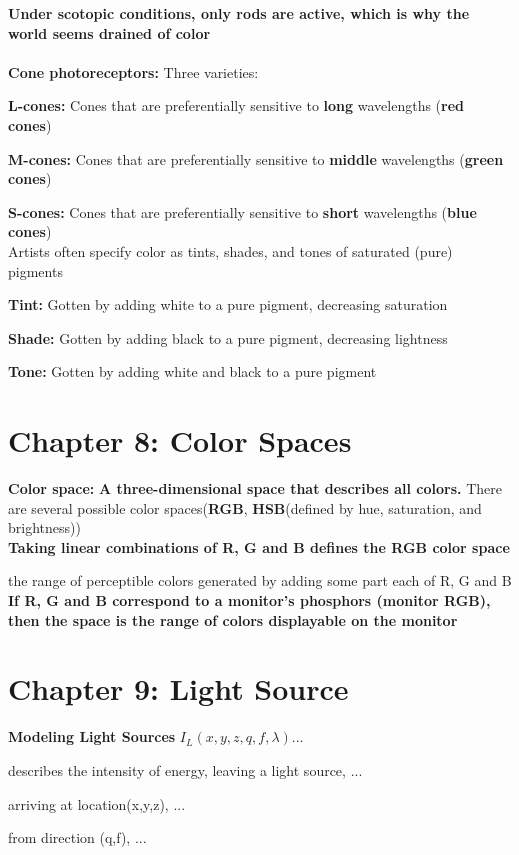 \documentclass[]{report}
\begin{document}
\textbf{Under scotopic conditions, only rods are active, which is why the world seems drained of color}\\
\\
\textbf{Cone photoreceptors:} Three varieties:

\textbf{L-cones:} Cones that are preferentially sensitive to \textbf{long} wavelengths
(\textbf{red cones})

\textbf{M-cones:} Cones that are preferentially sensitive to \textbf{middle}
wavelengths (\textbf{green cones})

\textbf{S-cones:} Cones that are preferentially sensitive to \textbf{short} wavelengths
(\textbf{blue cones})\\
Artists often specify color as tints, shades, and tones of
saturated (pure) pigments

\textbf{Tint:} Gotten by adding white to a pure pigment,
decreasing saturation

\textbf{Shade:} Gotten by adding
black to a pure pigment,
decreasing lightness

\textbf{Tone:} Gotten by adding
white and black to a pure
pigment

\section*{Chapter 8: Color Spaces}
\textbf{Color space:} \textbf{A three-dimensional space that describes all colors.} There are
several possible color spaces(\textbf{RGB}, \textbf{HSB}(defined by hue, saturation, and brightness))\\
\textbf{Taking linear combinations of R, G and B defines the
RGB color space}

the range of perceptible colors generated by adding
some part each of R, G and B\\
\textbf{If R, G and B correspond to a monitor’s phosphors
	(monitor RGB), then the space is the range of colors
	displayable on the monitor}

\section*{Chapter 9: Light Source}
\textbf{Modeling Light Sources }$I_L(x, y, z, q, f, \lambda)$...

describes the intensity of energy, leaving a light source, ...

arriving at location(x,y,z), ...

from direction (q,f), ...
\end{document}
